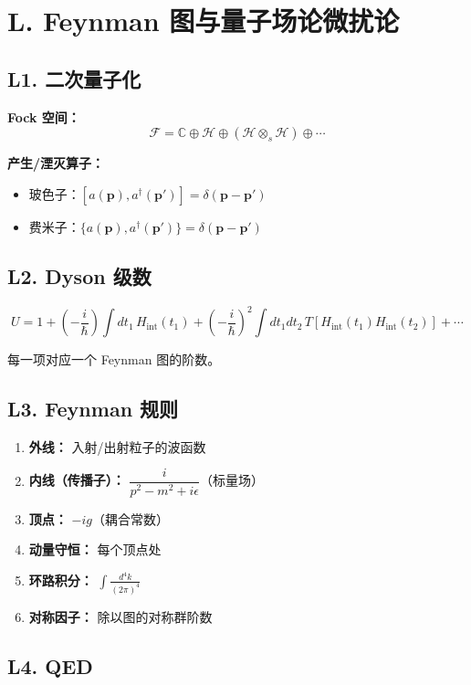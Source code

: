 \section{L. Feynman 图与量子场论微扰论}

\subsection{L1. 二次量子化}

\textbf{Fock 空间：}
\[
\mathcal{F} = \mathbb{C} \oplus \mathcal{H} \oplus (\mathcal{H}\otimes_s\mathcal{H}) \oplus \cdots
\]

\textbf{产生/湮灭算子：}
\begin{itemize}
  \item 玻色子：$[a(\mathbf{p}), a^\dagger(\mathbf{p}')] = \delta(\mathbf{p}-\mathbf{p}')$
  \item 费米子：$\{a(\mathbf{p}), a^\dagger(\mathbf{p}')\} = \delta(\mathbf{p}-\mathbf{p}')$
\end{itemize}

\subsection{L2. Dyson 级数}

\[
U = 1 + \left(-\frac{i}{\hbar}\right)\int dt_1\, H_{\text{int}}(t_1) + \left(-\frac{i}{\hbar}\right)^2\int dt_1 dt_2\, T[H_{\text{int}}(t_1)H_{\text{int}}(t_2)] + \cdots
\]

每一项对应一个 Feynman 图的阶数。

\subsection{L3. Feynman 规则}

\begin{enumerate}
  \item \textbf{外线：} 入射/出射粒子的波函数
  \item \textbf{内线（传播子）：} $\dfrac{i}{p^2 - m^2 + i\epsilon}$（标量场）
  \item \textbf{顶点：} $-ig$（耦合常数）
  \item \textbf{动量守恒：} 每个顶点处
  \item \textbf{环路积分：} $\displaystyle\int \frac{d^4k}{(2\pi)^4}$
  \item \textbf{对称因子：} 除以图的对称群阶数
\end{enumerate}

\subsection{L4. QED}

